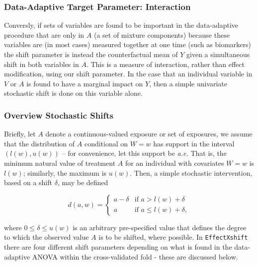 \documentclass[
]{article}
\begin{document}
\hypertarget{data-adaptive-target-parameter-interaction}{%
\subsubsection{Data-Adaptive Target Parameter:
Interaction}\label{data-adaptive-target-parameter-interaction}}

Conversly, if sets of variables are found to be important in the
data-adaptive procedure that are only in \(A\) (a set of mixture
components) because these variables are (in most cases) measured
together at one time (such as biomarkers) the shift parameter is instead
the counterfactual mean of \(Y\) given a simultaneous shift in both
variables in \(A\). This is a measure of interaction, rather than effect
modification, using our shift parameter. In the case that an individual
variable in \(V\) or \(A\) is found to have a marginal impact on \(Y\),
then a simple univariate stochastic shift is done on this variable
alone.

\hypertarget{overview-stochastic-shifts}{%
\subsubsection{Overview Stochastic
Shifts}\label{overview-stochastic-shifts}}

Briefly, let \(A\) denote a continuous-valued exposure or set of
exposures, we assume that the distribution of \(A\) conditional on
\(W = w\) has support in the interval \((l(w), u(w))\) -- for
convenience, let this support be \emph{a.e.} That is, the minimum
natural value of treatment \(A\) for an individual with covariates
\(W = w\) is \(l(w)\); similarly, the maximum is \(u(w)\). Then, a
simple stochastic intervention, based on a shift \(\delta\), may be
defined

\begin{equation}\label{eqn:shift}
  d(a, w) =
  \begin{cases}
    a - \delta & \text{if } a > l(w) + \delta \\
    a & \text{if } a \leq l(w) + \delta,
  \end{cases}
\end{equation}

where \(0 \leq \delta \leq u(w)\) is an arbitrary pre-specified value
that defines the degree to which the observed value \(A\) is to be
shifted, where possible. In \texttt{EffectXshift} there are four different
shift parameters depending on what is found in the data-adaptive ANOVA
within the cross-validated fold - these are discussed below.
\end{document}

